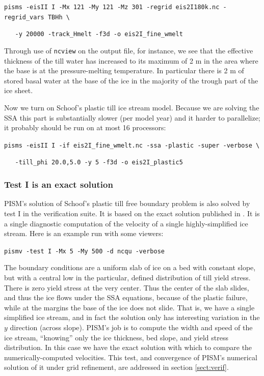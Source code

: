 \documentclass[11pt,final]{amsart}
\begin{document}
\verb|pisms -eisII I -Mx 121 -My 121 -Mz 301 -regrid eis2I180k.nc -regrid_vars TBHh \|

\verb|   -y 20000 -track_Hmelt -f3d -o eis2I_fine_wmelt|

\noindent Through use of \verb|ncview| on the output file, for instance, we see that the effective thickness of the till water has increased to its maximum of 2 m in the area where the base is at the pressure-melting temperature.  In particular there is 2 m of stored basal water at the base of the ice in the majority of the trough part of the ice sheet.

Now we turn on Schoof's plastic till ice stream model.  Because we are solving the SSA this part is substantially slower (per model year) and it harder to parallelize; it probably should be run on at most 16 processors:

\verb|pisms -eisII I -if eis2I_fine_wmelt.nc -ssa -plastic -super -verbose \|

\verb|   -till_phi 20.0,5.0 -y 5 -f3d -o eis2I_plastic5|


\subsubsection*{Test I is an exact solution}  PISM's solution of Schoof's plastic till free boundary problem is also solved by test I in the verification suite.  It is based on the exact solution published in \cite{SchoofStream}.  It is a single diagnostic computation of the velocity of a single highly-simplified ice stream.  Here is an example run with some viewers:

\verb|pismv -test I -Mx 5 -My 500 -d ncqu -verbose|

\noindent The boundary conditions are a uniform slab of ice on a bed with constant slope, but with a central low in the particular, defined distribution of till yield stress.  There is zero yield stress at the very center.  Thus the center of the slab slides, and thus the ice flows under the SSA equations, because of the plastic failure, while at the margins the base of the ice does not slide.  That is, we have a single simplified ice stream, and in fact the solution only has interesting variation in the $y$ direction (across slope).  PISM's job is to compute the width and speed of the ice stream, ``knowing'' only the ice thickness, bed slope, and yield stress distribution.  In this case we have the exact solution with which to compare the numerically-computed velocities.  This test, and convergence of PISM's numerical solution of it under grid refinement, are addressed in section \ref{sect:verif}.
\end{document}
